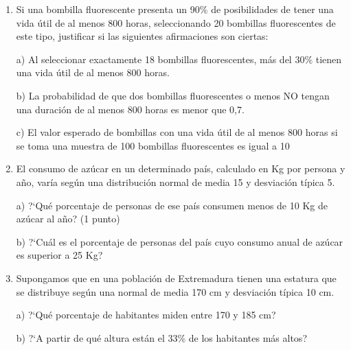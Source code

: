 \begin{adjustwidth}{20pt}{10pt}
\begin{enumerate}[PB. 1. ]
		\hspace{-1cm}\vspace{1cm}
		
		
		
		\item 	Si una bombilla fluorescente presenta un 90\% de posibilidades de tener una vida útil de al menos 800 horas, seleccionando 20 bombillas fluorescentes de este tipo, justificar si las siguientes afirmaciones son ciertas:
		 
a) Al seleccionar exactamente 18 bombillas fluorescentes, más del 30\% tienen una vida útil de al menos 800 horas. 

b) La probabilidad de que dos bombillas fluorescentes o menos NO tengan una duración de al menos 800 horas es menor que 0,7. 

c) El valor esperado de bombillas con una vida útil de al menos 800 horas si se toma una muestra de 100 bombillas fluorescentes es igual a 10
		
		\hspace{-1cm}\vspace{1cm}
		
		\item 	El consumo de azúcar en un determinado país, calculado en Kg  por persona y año, varía según una distribución normal de media 15 y desviación típica 5.

a) ?`Qué porcentaje de personas de ese país consumen menos de 10 Kg de azúcar al año? (1 punto) 

b) ?`Cuál es el porcentaje de personas del país cuyo consumo anual de azúcar es superior a 25 Kg?
		
		\hspace{-1cm}\vspace{1cm}
		
		
		
		\item 	 Supongamos que en una población de Extremadura tienen una estatura que se distribuye según una normal de media 170 cm y desviación típica 10 cm.

a) ?`Qué porcentaje de habitantes miden entre 170 y 185 cm?

b) ?`A partir de qué altura están el 33\% de los habitantes más altos?
		
		\hspace{-1cm}\vspace{1cm}
		

\end{enumerate}
\end{adjustwidth}
